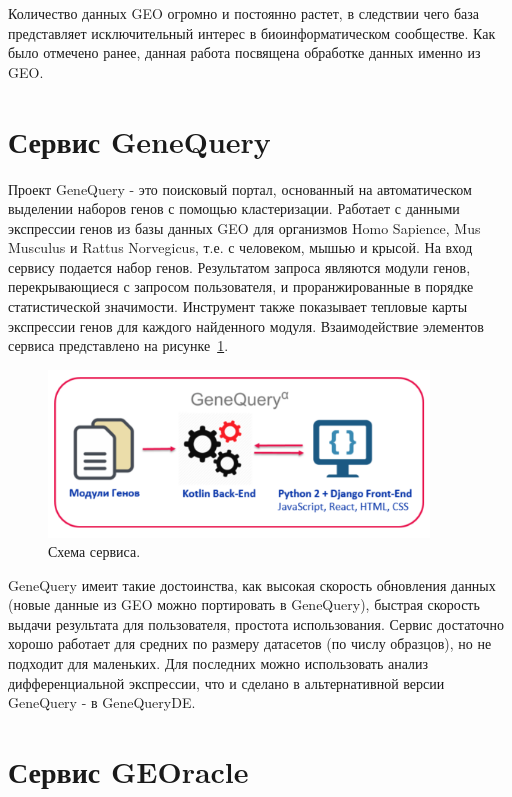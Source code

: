 \documentclass[times,specification,annotation]{itmo-student-thesis}
\begin{document}
Количество данных GEO огромно и постоянно растет, в следствии чего база представляет исключительный интерес в биоинформатическом сообществе. Как было отмечено ранее, данная работа посвящена обработке данных именно из GEO.   

\section{Сервис GeneQuery}

Проект GeneQuery \cite{GeneQuery} - это поисковый портал, основанный на автоматическом выделении наборов генов с помощью кластеризации. Работает с данными экспрессии генов из базы данных GEO для организмов Homo Sapience, Mus Musculus и Rattus Norvegicus, т.е. с человеком, мышью и крысой. На вход сервису подается набор генов. Результатом запроса являются модули генов, перекрывающиеся с запросом пользователя, и проранжированные в порядке статистической значимости. Инструмент также показывает тепловые карты экспрессии генов для каждого найденного модуля. 
Взаимодействие элементов сервиса представлено на рисунке~\ref{GeneQuery_service}. 

\begin{figure}[!h]
    \caption{Схема сервиса.}\label{GeneQuery_service}
    \centering
    \includegraphics[width=0.9\textwidth]{GeneQuery_scheme}
\end{figure} 

GeneQuery имеит такие достоинства, как высокая скорость обновления данных (новые данные из GEO можно портировать в GeneQuery), быстрая скорость выдачи результата для пользователя, простота использования. Сервис достаточно хорошо работает для средних по размеру датасетов (по числу образцов), но не подходит для маленьких. Для последних можно использовать анализ дифференциальной экспрессии, что и сделано в альтернативной версии GeneQuery - в GeneQueryDE. 

\section{Сервис GEOracle}
\end{document}
